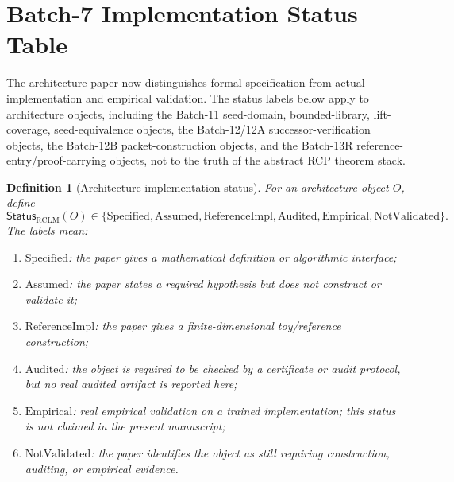 \documentclass[11pt,a4paper]{article}
\newtheorem{definition}[theorem]{Definition}
\newcommand{\RCLM}{\mathrm{RCLM}}
\begin{document}
\section{Batch-7 Implementation Status Table}
\label{sec:batch7-implementation-status}

The architecture paper now distinguishes formal specification from actual implementation and empirical validation. The status labels below apply to architecture objects, including the Batch-11 seed-domain, bounded-library, lift-coverage, seed-equivalence objects, the Batch-12/12A successor-verification objects, the Batch-12B packet-construction objects, and the Batch-13R reference-entry/proof-carrying objects, not to the truth of the abstract RCP theorem stack.

\begin{definition}[Architecture implementation status]
\label{def:rclm-implementation-status}
For an architecture object \(O\), define
\[
\mathsf{Status}_{\RCLM}(O)\in
\{\mathrm{Specified},\mathrm{Assumed},\mathrm{ReferenceImpl},\mathrm{Audited},\mathrm{Empirical},\mathrm{NotValidated}\}.
\]
The labels mean:
\begin{enumerate}[label=(\roman*),leftmargin=1.5em]
    \item \(\mathrm{Specified}\): the paper gives a mathematical definition or algorithmic interface;
    \item \(\mathrm{Assumed}\): the paper states a required hypothesis but does not construct or validate it;
    \item \(\mathrm{ReferenceImpl}\): the paper gives a finite-dimensional toy/reference construction;
    \item \(\mathrm{Audited}\): the object is required to be checked by a certificate or audit protocol, but no real audited artifact is reported here;
    \item \(\mathrm{Empirical}\): real empirical validation on a trained implementation; this status is not claimed in the present manuscript;
    \item \(\mathrm{NotValidated}\): the paper identifies the object as still requiring construction, auditing, or empirical evidence.
\end{enumerate}
\end{definition}
\end{document}
